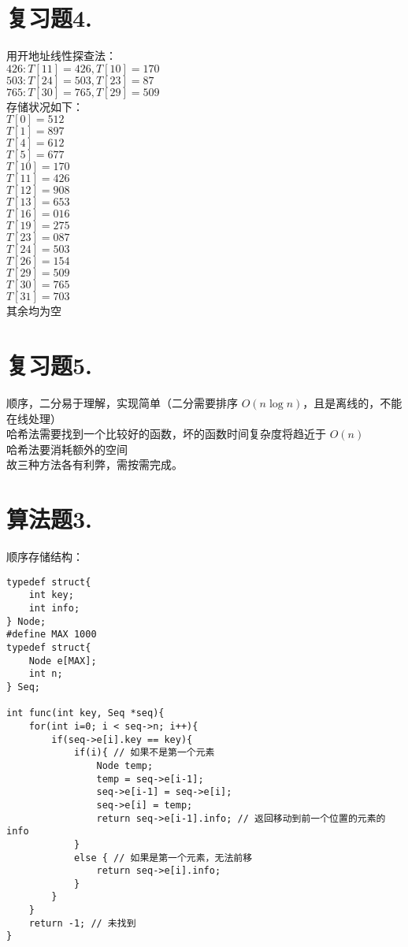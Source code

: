 \documentclass{ctexart}
\begin{document}
\section*{复习题4.}
用开地址线性探查法：\\
$426: T[11]=426, T[10]=170$ \\
$503: T[24]=503, T[23]=87$ \\
$765: T[30]=765, T[29]=509$ \\
存储状况如下：\\
$T[0] = 512$ \\
$T[1] = 897$ \\
$T[4] = 612$ \\
$T[5] = 677$ \\
$T[10] = 170$ \\
$T[11] = 426$ \\
$T[12] = 908$ \\
$T[13] = 653$ \\
$T[16] = 016$ \\
$T[19] = 275$ \\
$T[23] = 087$ \\
$T[24] = 503$ \\
$T[26] = 154$ \\
$T[29] = 509$ \\
$T[30] = 765$ \\
$T[31] = 703$ \\
其余均为空

\section*{复习题5.}
顺序，二分易于理解，实现简单（二分需要排序 $O(n\log n)$，且是离线的，不能在线处理）\\
哈希法需要找到一个比较好的函数，坏的函数时间复杂度将趋近于 $O(n)$ \\
哈希法要消耗额外的空间 \\
故三种方法各有利弊，需按需完成。

\section*{算法题3.}
顺序存储结构：
\begin{lstlisting}
typedef struct{
    int key;
    int info;
} Node;
#define MAX 1000
typedef struct{
    Node e[MAX];
    int n;
} Seq;

int func(int key, Seq *seq){
    for(int i=0; i < seq->n; i++){
        if(seq->e[i].key == key){
            if(i){ // 如果不是第一个元素
                Node temp;
                temp = seq->e[i-1];
                seq->e[i-1] = seq->e[i];
                seq->e[i] = temp;
                return seq->e[i-1].info; // 返回移动到前一个位置的元素的info
            }
            else { // 如果是第一个元素，无法前移
                return seq->e[i].info;
            }
        }
    }
    return -1; // 未找到
}
\end{lstlisting}
\end{document}
